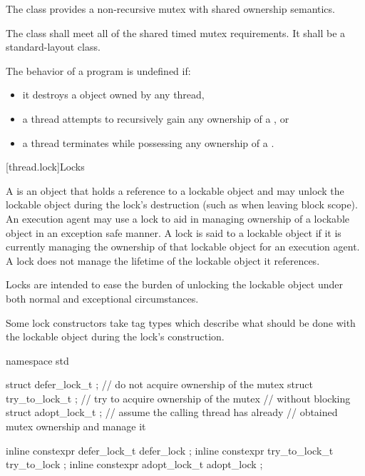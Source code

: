 \pnum
The class  provides a non-recursive mutex with shared
ownership semantics.

\pnum
The class  shall meet all of the
shared timed mutex requirements.
It shall be a standard-layout class.

\pnum
The behavior of a program is undefined if:
\begin{itemize}
\item it destroys a  object owned by any thread,
\item a thread attempts to recursively gain any ownership of a , or
\item a thread terminates while possessing any ownership of a .
\end{itemize}

[thread.lock]{Locks}

\pnum
A  is an object that holds a reference to a lockable object and may unlock the
lockable object during the lock's destruction (such as when leaving block scope). An execution
agent may use a lock to aid in managing ownership of a lockable object in an exception safe
manner. A lock is said to  a lockable object if it is currently managing the
ownership of that lockable object for an execution agent. A lock does not manage the lifetime
of the lockable object it references. \begin{note} Locks are intended to ease the burden of
unlocking the lockable object under both normal and exceptional circumstances. \end{note}

\pnum
Some lock constructors take tag types which describe what should be done with the lockable
object during the lock's construction.

%
%
%
%
%
%
\begin{codeblock}
namespace std {
  struct defer_lock_t  { };     // do not acquire ownership of the mutex
  struct try_to_lock_t { };     // try to acquire ownership of the mutex
                                // without blocking
  struct adopt_lock_t  { };     // assume the calling thread has already
                                // obtained mutex ownership and manage it

  inline constexpr defer_lock_t   defer_lock { };
  inline constexpr try_to_lock_t  try_to_lock { };
  inline constexpr adopt_lock_t   adopt_lock { };
}
\end{codeblock}

